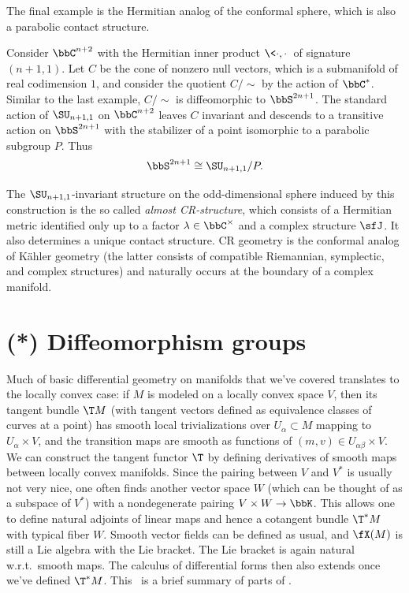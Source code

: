 The final example is the Hermitian analog of the conformal sphere, which is also a parabolic contact structure.

\begin{example}[CR-sphere]
    Consider $\bbC^{n+2}$ with the Hermitian inner product $\<\cdot,\cdot\>$ of signature $(n+1,1)$. Let $C$ be the cone of nonzero null vectors, which is a submanifold of real codimension $1$, and consider the quotient $C\slash \sim$ by the action of $\bbC^\ast$. Similar to the last example, $C\slash \sim$ is diffeomorphic to $\bbS^{2n+1}$. The standard action of $\SU_{n+1,1}$ on $\bbC^{n+2}$ leaves $C$ invariant and descends to a transitive action on $\bbS^{2n+1}$ with the stabilizer of a point isomorphic to a parabolic subgroup $P$. Thus 
    \[\bbS^{2n+1}\cong \SU_{n+1,1}\slash P.\]
\end{example}

The $\SU_{n+1,1}$-invariant structure on the odd-dimensional sphere induced by this construction is the so called \emph{almost CR-structure}, which consists of a Hermitian metric identified only up to a factor $\lambda\in\bbC^\times$ and a complex structure $\sfJ$. It also determines a unique contact structure. CR geometry is the conformal analog of K\"ahler geometry (the latter consists of compatible Riemannian, symplectic, and complex structures) and naturally occurs at the boundary of a complex manifold.








\section{(*) Diffeomorphism groups}\label{sec: Diff groups}


Much of basic differential geometry on manifolds that we've covered translates to the locally convex case: if $M$ is modeled on a locally convex space $V$, then its tangent bundle $\T M$ (with tangent vectors defined as equivalence classes of curves at a point) has smooth local trivializations over $U_\alpha\subset M$ mapping to $U_\alpha\times V$, and the transition maps are smooth as functions of $(m,v)\in U_{\alpha\beta}\times V$. We can construct the tangent functor $\T$ by defining derivatives of smooth maps between locally convex manifolds. Since the pairing between $V$ and $V^\ast$ is usually not very nice, one often finds another vector space $W$ (which can be thought of as a subspace of $V^\ast$) with a nondegenerate pairing $V\times W\to \bbK$. This allows one to define natural adjoints of linear maps and hence a cotangent bundle $\T^\ast M$ with typical fiber $W$. Smooth vector fields can be defined as usual, and $\fX(M)$ is still a Lie algebra with the Lie bracket. The Lie bracket is again natural w.r.t.\ smooth maps. The calculus of differential forms then also extends once we've defined $\T^\ast M$. This \sect\ is a brief summary of parts of \cite{Neeb}.

